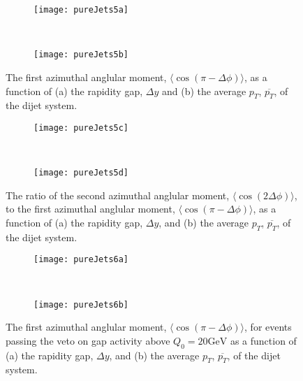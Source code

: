 	\begin{figure}[bth]
		\centering
		\begin{subfigure}[b]{0.48\textwidth}
			\texttt{[image: pureJets5a]}
			\caption{}
			\label{fig:}
		\end{subfigure}
		~
		\begin{subfigure}[b]{0.48\textwidth}
			\texttt{[image: pureJets5b]}
			\caption{}
			\label{fig:}
		\end{subfigure}
		\caption{The first azimuthal anglular moment, $\langle \cos(\pi-\Delta\phi)\rangle$, as a function of (a) the rapidity gap, $\Delta y$
		         and (b) the average $p_T$, $\overline{p_T}$, of the dijet system.}
		\label{fig:atlasPJ3}
	\end{figure}

	\begin{figure}[bth]
		\begin{subfigure}[b]{0.48\textwidth}
			\texttt{[image: pureJets5c]}
			\caption{}
			\label{fig:}
		\end{subfigure}
		~
		\begin{subfigure}[b]{0.48\textwidth}
			\texttt{[image: pureJets5d]}
			\caption{}
			\label{fig:}
		\end{subfigure}
		\caption{The ratio of the second azimuthal anglular moment, $\langle \cos(2\Delta\phi)\rangle$, to the first azimuthal
		         anglular moment, $\langle \cos(\pi-\Delta\phi)\rangle$, as a function of (a) the rapidity gap, $\Delta y$, and (b) the
		         average $p_T$, $\overline{p_T}$, of the dijet system.}
		\label{fig:atlasPJ4}
	\end{figure}

	\begin{figure}[bth]
		\centering
		\begin{subfigure}[b]{0.48\textwidth}
			\texttt{[image: pureJets6a]}
			\caption{}
			\label{fig:}
		\end{subfigure}
		~
		\begin{subfigure}[b]{0.48\textwidth}
			\texttt{[image: pureJets6b]}
			\caption{}
			\label{fig:}
		\end{subfigure}
		\caption{The first azimuthal anglular moment, $\langle \cos(\pi-\Delta\phi)\rangle$, for events passing the veto on gap activity
		         above $Q_0=20\text{GeV}$ as a function of (a) the rapidity gap, $\Delta y$, and (b) the average $p_T$, $\overline{p_T}$,
		         of the dijet system.}
		\label{fig:atlasPJ5}
	\end{figure}

